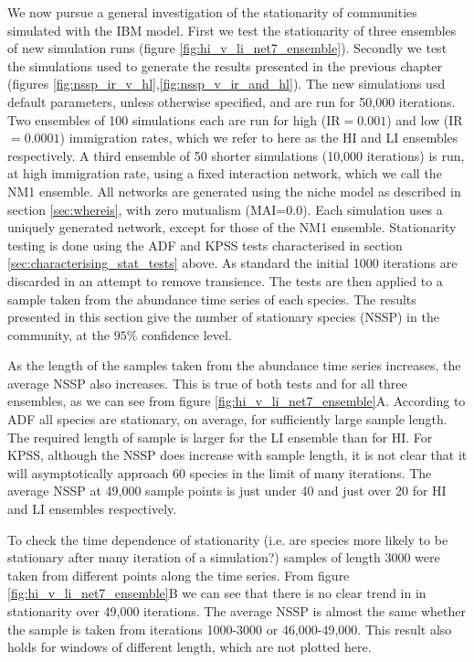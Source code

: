 We now pursue a general investigation of the stationarity of communities simulated with the IBM model. First we test the stationarity of three ensembles of new simulation runs (figure \ref{fig:hi_v_li_net7_ensemble}). Secondly we test the simulations used to generate the results presented in the previous chapter (figures \ref{fig:nssp_ir_v_hl},\ref{fig:nssp_v_ir_and_hl}). The new simulations usd default parameters, unless otherwise specified, and are run for 50,000 iterations. Two ensembles of 100 simulations each are run for high (IR$=0.001$) and low (IR$=0.0001$) immigration rates, which we refer to here as the HI and LI ensembles respectively. A third ensemble of 50 shorter simulations (10,000 iterations) is run, at high immigration rate, using a fixed interaction network, which we call the NM1 ensemble. All networks are generated using the niche model as described in section \ref{sec:whereis}, with zero mutualism (MAI=$0.0$). Each simulation uses a uniquely generated network, except for those of the NM1 ensemble. Stationarity testing is done using the ADF and KPSS tests characterised in section \ref{sec:characterising_stat_tests} above. As standard the initial 1000 iterations are discarded in an attempt to remove transience. The tests are then applied to a sample taken from the abundance time series of each species. The results presented in this section give the number of stationary species (NSSP) in the community, at the $95\%$ confidence level.

As the length of the samples taken from the abundance time series increases, the average NSSP also increases. This is true of both tests and for all three ensembles, as we can see from figure \ref{fig:hi_v_li_net7_ensemble}A. According to ADF all species are stationary, on average, for sufficiently large sample length. The required length of sample is larger for the LI ensemble than for HI. For KPSS, although the NSSP does increase with sample length, it is not clear that it will asymptotically approach 60 species in the limit of many iterations. The average NSSP at 49,000 sample points is just under 40 and   just over 20 for HI and LI ensembles respectively.

To check the time dependence of stationarity (i.e. are species more likely to be stationary after many iteration of a simulation?) samples of length 3000 were taken from different points along the time series. From figure \ref{fig:hi_v_li_net7_ensemble}B we can see that there is no clear trend in in stationarity over 49,000 iterations. The average NSSP is almost the same whether the sample is taken from iterations 1000-3000 or 46,000-49,000. This result also holds for windows of different length, which are not plotted here.

